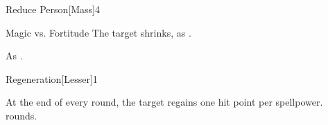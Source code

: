 \begin{spellsection}{Reduce Person}[Mass]{4}
    \begin{spellheader}
    \end{spellheader}
    \begin{spellcontent}
        \begin{spelltargetinginfo}
        \end{spelltargetinginfo}
        \begin{spelleffects}
            \begin{spellattack}{Magic vs. Fortitude}
                \spellsuccess The target shrinks, as .
            \end{spellattack}
            \spelldur \durshort \dismissable
        \end{spelleffects}
    \end{spellcontent}
    \begin{spellfooter}
        \spellnotes As .
        \miscastexplode
    \end{spellfooter}
\end{spellsection}

\begin{spellsection}{Regeneration}[Lesser]{1}
    \begin{spellheader}
    \end{spellheader}
    \begin{spellcontent}
        \begin{spelltargetinginfo}
        \end{spelltargetinginfo}
        \begin{spelleffects}
            \spelleffect At the end of every round, the target regains one hit point per spellpower.
             rounds.
        \end{spelleffects}
    \end{spellcontent}
    \begin{spellfooter}
        \miscastexplode
    \end{spellfooter}
\end{spellsection}

